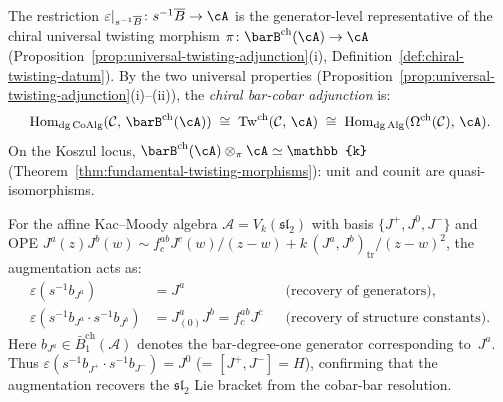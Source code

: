 \begin{remark}
\label{rem:chiral-adjunction-via-tw}
The restriction
$\varepsilon|_{s^{-1}\overline{B}}\colon
s^{-1}\overline B\to\cA$
is the generator-level representative of the chiral universal twisting
morphism
$\pi\colon\barB^{\mathrm{ch}}(\cA) \to \cA$
(Proposition~\ref{prop:universal-twisting-adjunction}(i),
Definition~\ref{def:chiral-twisting-datum}).
By the two universal properties
(Proposition~\ref{prop:universal-twisting-adjunction}(i)--(ii)),
the \emph{chiral bar-cobar adjunction} is:
\begin{equation}\label{eq:chiral-tw-adjunction}
\mathrm{Hom}_{\mathrm{dg\,CoAlg}}(\mathcal{C},\,
 \barB^{\mathrm{ch}}(\cA))
\;\cong\;
\mathrm{Tw}^{\mathrm{ch}}(\mathcal{C},\, \cA)
\;\cong\;
\mathrm{Hom}_{\mathrm{dg\,Alg}}(\Omega^{\mathrm{ch}}(\mathcal{C}),\,
 \cA).
\end{equation}
On the Koszul locus,
$\barB^{\mathrm{ch}}(\cA) \otimes_\pi \cA \simeq \mathbb{k}$
(Theorem~\ref{thm:fundamental-twisting-morphisms}): unit and counit
are quasi-isomorphisms.
\end{remark}

\begin{example}
\label{ex:augmentation-sl2}
For the affine Kac--Moody algebra
$\mathcal{A} = V_k(\mathfrak{sl}_2)$ with basis
$\{J^+, J^0, J^-\}$ and OPE
$J^a(z) J^b(w) \sim f^{ab}_c J^c(w)/(z-w)
+ k\,(J^a, J^b)_{\mathrm{tr}}/(z-w)^2$,
the augmentation acts as:
\begin{align*}
\varepsilon(s^{-1}b_{J^a}) &= J^a
 &&\text{(recovery of generators),} \\
\varepsilon(s^{-1}b_{J^a} \cdot s^{-1}b_{J^b})
&= J^a_{(0)}J^b = f^{ab}_c J^c
 &&\text{(recovery of structure constants).}
\end{align*}
Here $b_{J^a}\in\bar B^{\mathrm{ch}}_1(\mathcal A)$ denotes the
bar-degree-one generator corresponding to~$J^a$. Thus
$\varepsilon(s^{-1}b_{J^+} \cdot s^{-1}b_{J^-}) = J^0$
(= $[J^+, J^-] = H$),
confirming that the augmentation recovers the
$\mathfrak{sl}_2$ Lie bracket from the cobar-bar resolution.
\end{example}

